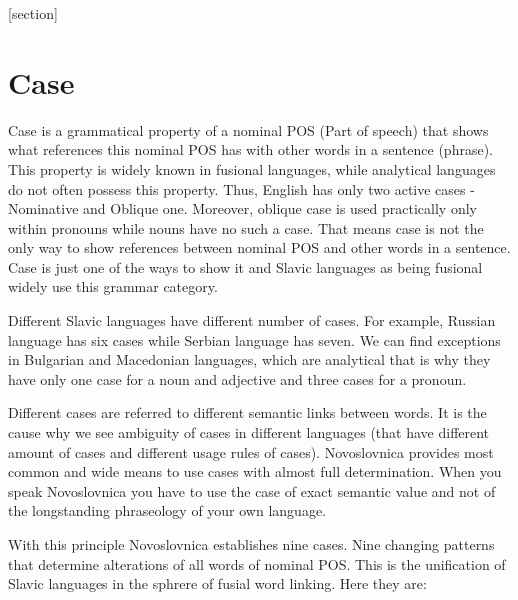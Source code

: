 [section]
\section{Case}

Case is a grammatical property of a nominal POS (Part of speech) that shows what references this nominal POS has with other words in a sentence (phrase). This property is widely known in fusional languages, while analytical languages do not often possess this property. Thus, English has only two active cases - Nominative and Oblique one. Moreover, oblique case is used practically only within pronouns while nouns have no such a case. That means case is not the only way to show references between nominal POS and other words in a sentence. Case is just one of the ways to show it and Slavic languages as being fusional widely use this grammar category.

Different Slavic languages have different number of cases. For example, Russian language has six cases while Serbian language has seven. We can find exceptions in Bulgarian and Macedonian languages, which are analytical that is why they have only one case for a noun and adjective and three cases for a pronoun.

Different cases are referred to different semantic links between words. It is the cause why we see ambiguity of cases in different languages (that have different amount of cases and different usage rules of cases). Novoslovnica provides most common and wide means to use cases with almost full determination. When you speak Novoslovnica you have to use the case of exact semantic value and not of the longstanding phraseology of your own language.

With this principle Novoslovnica establishes nine cases. Nine changing patterns that determine alterations of all words of nominal POS. This is the unification of Slavic languages in the sphrere of fusial word linking. Here they are:


